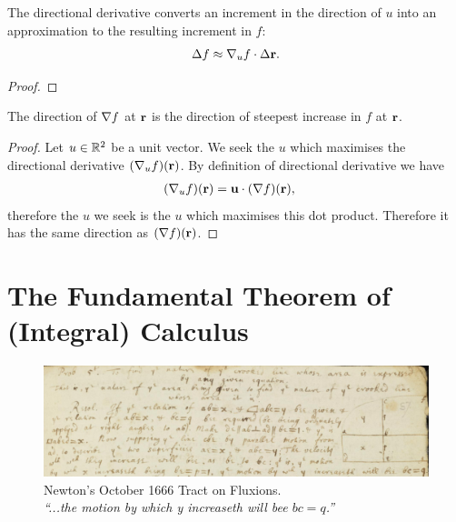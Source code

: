 \begin{theorem*}
  The directional derivative converts an increment in the direction of $u$ into an approximation to
  the resulting increment in $f$:
  \begin{align*}
    \Delta f \approx \nabla_u f \cdot \Delta \mathbf{r}.
  \end{align*}
\end{theorem*}

\begin{proof}
  \todo{}
\end{proof}

\begin{theorem*}
  The direction of $\nabla f$ at $\mathbf{r}$ is the direction of steepest increase in $f$ at $\mathbf{r}$.
\end{theorem*}

\begin{proof}
  Let $u \in \mathbb{R}^2$ be a unit vector. We seek the $u$ which maximises the directional derivative
  $(\nabla_u f)(\mathbf{r})$. By definition of directional derivative we have
  \begin{align*}
    (\nabla_u f)(\mathbf{r}) &= \mathbf{u} \cdot (\nabla f)(\mathbf{r}),
  \end{align*}
  therefore the $u$ we seek is the $u$ which maximises this dot product. Therefore it has the same
  direction as $(\nabla f)(\mathbf{r})$.
\end{proof}




\newpage
\section{The Fundamental Theorem of (Integral) Calculus}

\begin{figure}[h]
  \centering
  \includegraphics[width=500pt]{img/newton-october-1666-tract-ftc.png}
  \captionsetup{labelformat=empty,justification=centering}
  \caption[xxx]{Newton's October 1666 Tract on Fluxions.\\
    \emph{``...the motion by which y increaseth will bee $bc = q$.''}}
\end{figure}

